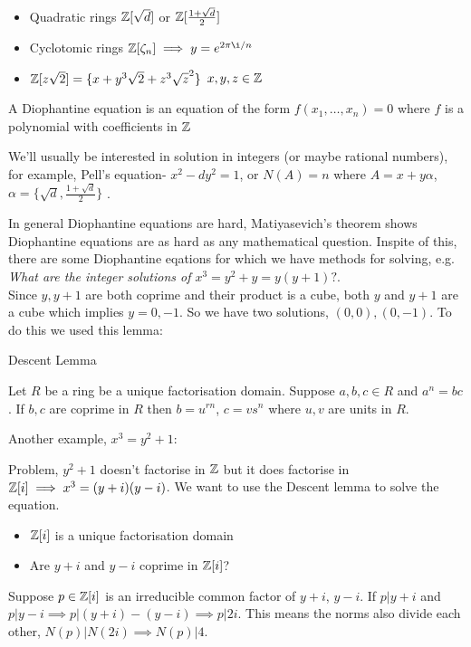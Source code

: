 \documentclass[11pt]{article}
\begin{document}
	\begin{itemize}
		\item{Quadratic rings $\mathbb{Z}[\sqrt{d}]$ or $\mathbb{Z} [\frac{1+\sqrt{d}}{2}]$}
		\item{Cyclotomic rings $\Z[\zeta_n] \implies y = e^{2\pi \i /n }$}
		\item{$\mathbb{Z}[z\sqrt{2}] = \{ x+y^3\sqrt{2} + z^3 \sqrt{z}^2 \}$ $x,y,z \in \mathbb{Z}$}
	\end{itemize}


	\begin{defn}
		A Diophantine equation is an equation of the form $f(x_1, \dots, x_n)=0 $ where $f$ is a polynomial with coefficients in $\mathbb{Z}$ 
	\end{defn}

	We'll usually be interested in solution in integers (or maybe rational numbers), for example, Pell's equation- $x^2 - dy^2 = 1$, or $N(A) = n $ where $A= x + y \alpha $, $\alpha = \{ \sqrt{d},  \frac{1+\sqrt{d}}{2}\}$ .

	In general Diophantine equations are hard, Matiyasevich's theorem shows Diophantine equations are as hard as any mathematical question.
	Inspite of this, there are some Diophantine eqations for which we have methods for solving, e.g. \textit{What are the integer solutions of $x^3 = y^2 + y = y(y+1) ? $}.
	$ $\\[1em]
	Since  $y,y+1$ are both coprime and their product is a cube, both $y$ and $y+1$ are a cube which implies $y=0,-1$. So we have two solutions, $(0,0), (0,-1)$. To do this we used this lemma:


	\begin{lemma}
		Descent Lemma $ $

		Let $R$ be a ring be a unique factorisation domain. Suppose $a,b,c \in R$ and $a^n = bc$. If $b,c$ are coprime in $R$ then $b=u^{rn}$, $ c=vs^n$ where $u,v$ are units in $R$.
	\end{lemma}

Another example, $x^3 = y^2 + 1$:

	Problem, $y^2+1$ doesn't factorise in $\mathbb{Z}$ but it does factorise in $\mathbb{Z}[i] \implies x^3 = (y+i)(y-i)$. We want to use the Descent lemma to solve the equation.
	\begin{itemize}
		\item{$\mathbb{Z}[i]$ is a unique factorisation domain}
		\item{Are $y+i$ and $y-i$ coprime in $\mathbb{Z}[i]$? }
	\end{itemize}
	Suppose $p \in \mathbb{Z}[i]$ is an irreducible common factor of $y+i$, $y-i$. If $p | y+i$ and $p|y-i \implies p|(y+i) - (y-i) \implies p | 2i$. This means the norms also divide each other, $N(p) | N(2i) \implies N(p) | 4 $.
\end{document}
